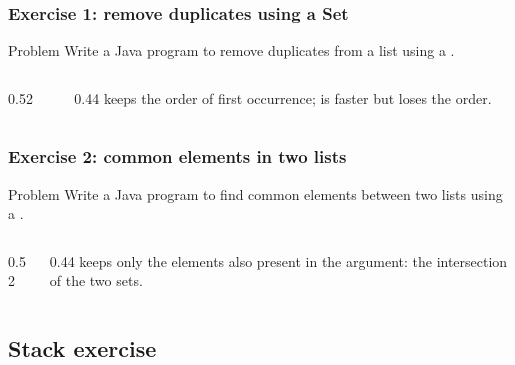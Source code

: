 \documentclass[aspectratio=169,10pt, compress]{beamer}
\begin{document}
\begin{frame}[t,fragile] \frametitle{Exercise 1: remove duplicates using a Set}
  \begin{block}{Problem}
    Write a Java program to remove duplicates from a list using a
    .
  \end{block}
  \begin{columns}[T]
    \begin{column}{0.52\textwidth}
    \end{column}
    \begin{column}{0.44\textwidth}
      \small
       keeps the order of first occurrence;
       is faster but loses the order.
    \end{column}
  \end{columns}
\end{frame}




\begin{frame}[t,fragile] \frametitle{Exercise 2: common elements in two lists}
  \begin{block}{Problem}
    Write a Java program to find common elements between two lists
    using a .
  \end{block}
  \begin{columns}[T]
    \begin{column}{0.52\textwidth}
    \end{column}
    \begin{column}{0.44\textwidth}
      \small
       keeps only the elements also present in the
      argument: the intersection of the two sets.
    \end{column}
  \end{columns}
\end{frame}

\subsection[Stack]{Stack exercise}
\end{document}

